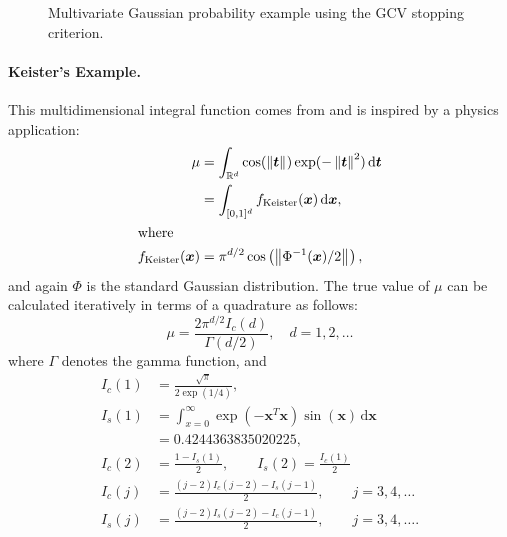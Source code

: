 \documentclass[twocolumn]{svjour3}          %
\newcommand{\bm}[1]{\boldsymbol{#1}}
\newcommand{\dif}[1]{\text{d}{#1}}
\newcommand{\reals}{\mathbb{R}}
\newcommand{\vt}{\bm{t}}
\newcommand{\vx}{\bm{x}}
\newcommand{\dvx}{\dif{\bm{x}}}
\newcommand{\dvt}{\dif{\bm{t}}}
\newcommand{\norm}[2][{}]{\ensuremath{\left \lVert #2 \right \rVert}_{#1}}
\begin{document}
\begin{figure}
	\caption[MVN guaranteed : GCV]{Multivariate Gaussian probability example using the GCV stopping criterion.}
	\label{fig:mvn-guaranteed-GCV}
\end{figure}

\paragraph{Keister's Example.}

This multidimensional integral function comes from \cite{Kei96} and is inspired by a physics application:
\begin{align*}
\mu & =  \int_{\reals^d} \cos(\norm{ \vt}) \exp(-\norm{ \vt }^2) \, \dvt \\
\nonumber
& = \int_{[0,1]^d} f_{\textup{Keister}}(\vx) \, \dvx,\\
\intertext{where }
f_\textup{Keister}(\vx) &= \pi^{d/2} \cos\left(\norm{ \Phi^{-1}(\vx)/2}\right)  ,
\end{align*}
and again $\Phi$ is the standard Gaussian distribution.
The true value of $\mu$ can be calculated iteratively in terms of a quadrature as follows:  
\begin{equation*}
\mu = \frac{2 \pi^{d/2} I_c(d)}{\Gamma(d/2)}, \quad d=1,2, \ldots
\end{equation*}
where $\Gamma$ denotes the gamma function, and
\begin{align*}
I_c(1) &= \frac{\sqrt{\pi}}{2 \exp(1/4)}, 
\\
I_s(1) &= \int_{x=0}^\infty \exp(-\vx^T\vx)\sin(\vx) \, \dvx 
\\
& =  0.4244363835020225,
\\
I_c(2) &= \frac{1-I_s(1)}{2}, \qquad
I_s(2) = \frac{I_c(1)}{2}
\\
I_c(j) &= \frac{(j-2)I_c(j-2)-I_s(j-1)}{2},
\qquad j =3,4,\ldots
\\
I_s(j) &= \frac{(j-2)I_s(j-2)-I_c(j-1)}{2},
\qquad j =3,4,\ldots.
\end{align*}
\end{document}
